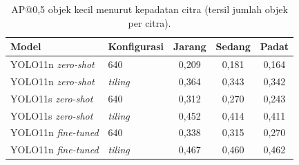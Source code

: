 \begin{table}[t]
\caption{AP@0,5 objek kecil menurut kepadatan citra (tersil jumlah objek per citra).}
\label{tab:kepadatan}
\centering\scriptsize
\begin{tabular}{llccc}
\toprule
Model & Konfigurasi & Jarang & Sedang & Padat \\
\midrule
YOLO11n \textit{zero-shot} & 640 & 0,209 & 0,181 & 0,164 \\
YOLO11n \textit{zero-shot} & \textit{tiling} & 0,364 & 0,343 & 0,342 \\
YOLO11s \textit{zero-shot} & 640 & 0,312 & 0,270 & 0,243 \\
YOLO11s \textit{zero-shot} & \textit{tiling} & 0,452 & 0,414 & 0,411 \\
YOLO11n \textit{fine-tuned} & 640 & 0,338 & 0,315 & 0,270 \\
YOLO11n \textit{fine-tuned} & \textit{tiling} & 0,467 & 0,460 & 0,462 \\
\bottomrule
\end{tabular}
\end{table}
